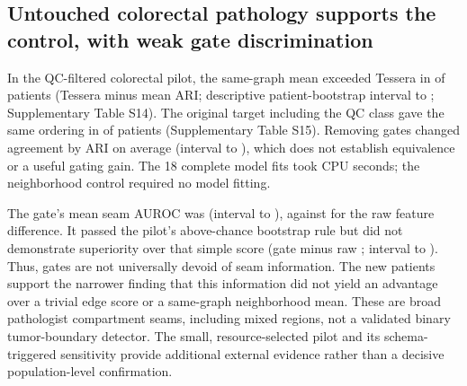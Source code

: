 \subsection{Untouched colorectal pathology supports the control, with weak gate discrimination}
In the QC-filtered colorectal pilot, the same-graph mean exceeded Tessera in \CrcTessMeanNeg{} of \CrcPatients{} patients (Tessera minus mean \CrcTessMeanDelta{} ARI; descriptive patient-bootstrap interval \CrcTessMeanLow{} to \CrcTessMeanHigh{}; Supplementary Table S14). The original target including the QC class gave the same ordering in \CrcRawTessMeanNeg{} of \CrcPatients{} patients (Supplementary Table S15). Removing gates changed agreement by \CrcNoGateDelta{} ARI on average (interval \CrcNoGateLow{} to \CrcNoGateHigh{}), which does not establish equivalence or a useful gating gain. The 18 complete model fits took \CrcFitSeconds{} CPU seconds; the neighborhood control required no model fitting.

The gate's mean seam AUROC was \CrcGate{} (interval \CrcGateLow{} to \CrcGateHigh{}), against \CrcRaw{} for the raw feature difference. It passed the pilot's above-chance bootstrap rule but did not demonstrate superiority over that simple score (gate minus raw \CrcGateRawDelta{}; interval \CrcGateRawLow{} to \CrcGateRawHigh{}). Thus, gates are not universally devoid of seam information. The new patients support the narrower finding that this information did not yield an advantage over a trivial edge score or a same-graph neighborhood mean. These are broad pathologist compartment seams, including mixed regions, not a validated binary tumor-boundary detector. The small, resource-selected pilot and its schema-triggered sensitivity provide additional external evidence rather than a decisive population-level confirmation.


